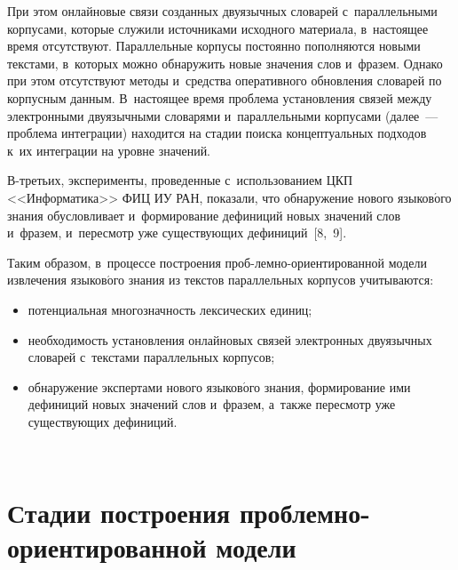 \begin{multicols}{2}
  При этом онлайновые связи созданных двуязычных словарей 
с~параллельными корпусами, которые служили источниками исходного 
материала, в~на\-сто\-ящее время отсутствуют. Параллельные корпусы постоянно 
пополняются новыми текс\-та\-ми, в~которых можно обнаружить новые значения 
слов и~фразем. Однако при этом отсутствуют методы и~средства оперативного 
об\-нов\-ле\-ния словарей по корпусным данным. В~настоящее время проб\-ле\-ма 
уста\-нов\-ле\-ния связей между электронными двуязычными словарями 
и~параллельными корпусами (далее~--- проб\-ле\-ма интеграции) находится на 
стадии поиска концептуальных подходов к~их интеграции на уровне значений.
  
  В-третьих, эксперименты, проведенные с~использованием ЦКП 
<<Информатика>> ФИЦ ИУ РАН, показали, что обнаружение нового 
языков$\acute{\mbox{о}}$го знания обусловливает и~формирование дефиниций 
новых значений слов и~фразем, и~пересмотр уже существующих дефиниций~[8,~9].
  
  Таким образом, в~процессе построения  
проб-\linebreak лем\-но-ори\-ен\-ти\-ро\-ван\-ной модели извлечения 
язы\-ко\-в$\acute{\mbox{о}}$\-го знания из текстов параллельных корпусов 
учитываются:
  \begin{itemize}
  \item потенциальная многозначность лексических единиц;
  \item необходимость установления онлайновых связей электронных 
двуязычных словарей с~текс\-та\-ми параллельных корпусов;
  \item обнаружение экспертами нового языков$\acute{\mbox{о}}$го знания, 
формирование ими дефиниций новых значений слов и~фразем, а~также 
пересмотр уже су\-щест\-ву\-ющих дефиниций. 
  \end{itemize}
  
   \begin{figure*} %
  \vspace*{1pt}
  \begin{center}
 \mbox{%
 \epsfxsize=88.717mm 
 }
\end{center}
\vspace*{-9pt}
  \vspace*{-6pt}
  \end{figure*}
  
\section{Стадии построения проблемно-ориентированной модели}
  

\end{multicols}
